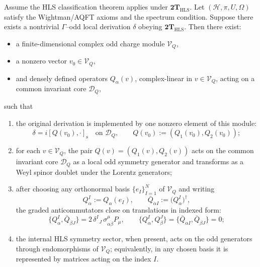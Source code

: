 \begin{theorem}
\label{thm:HLS}
Assume the HLS classification theorem applies under $\mathbf{2T}_{\mathrm{HLS}}$.
Let $(\mathcal H,\pi,U,\Omega)$ satisfy the Wightman/AQFT axioms and the spectrum
condition. Suppose there exists a nontrivial $\Gamma$--odd local derivation
$\delta$ obeying $\mathbf{2T}_{\mathrm{HLS}}$. Then there exist:
\begin{itemize}[leftmargin=*,itemsep=0.2em]
\item a finite-dimensional complex odd charge module \(\mathcal V_Q\),
\item a nonzero vector \(v_0\in\mathcal V_Q\),
\item and densely defined operators \(Q_\alpha(v)\), complex-linear in
      \(v\in\mathcal V_Q\), acting on a common invariant core \(\mathcal D_Q\),
\end{itemize}
such that
\begin{enumerate}[label=\textnormal{(\roman*)},leftmargin=*,itemsep=0.3em]
\item the original derivation is implemented by one nonzero element of
  this module:
  \[
  \delta=i[Q(v_0),\cdot]_{\mathrm s}\quad\text{on }\mathcal D_Q,
  \qquad
  Q(v_0):=(Q_1(v_0),Q_2(v_0));
  \]
\item for each \(v\in\mathcal V_Q\), the pair \(Q(v)=(Q_1(v),Q_2(v))\)
  acts on the common invariant core \(\mathcal D_Q\) as a local odd symmetry
  generator and transforms as a Weyl spinor doublet under the Lorentz generators;
\item after choosing any orthonormal basis \(\{e_I\}_{I=1}^N\) of
  \(\mathcal V_Q\) and writing
  \[
  Q_\alpha^I:=Q_\alpha(e_I),\qquad
  \bar Q_{\dot\alpha I}:=\bigl(Q_\alpha^I\bigr)^\dagger,
  \]
  the graded anticommutators close on translations in indexed form:
  \[
  \{Q_\alpha^I,\bar Q_{\dot\beta J}\}
  =2\,\delta^I{}_J\,\sigma^\mu_{\alpha\dot\beta}P_\mu,
  \qquad
  \{Q_\alpha^I,Q_\beta^J\}
  =\{\bar Q_{\dot\alpha I},\bar Q_{\dot\beta J}\}=0;
  \]
\item the internal HLS symmetry sector, when present, acts on the odd
  generators through endomorphisms of \(\mathcal V_Q\); equivalently, in
  any chosen basis it is represented by matrices acting on the index
  \(I\).
\end{enumerate}
\end{theorem}

